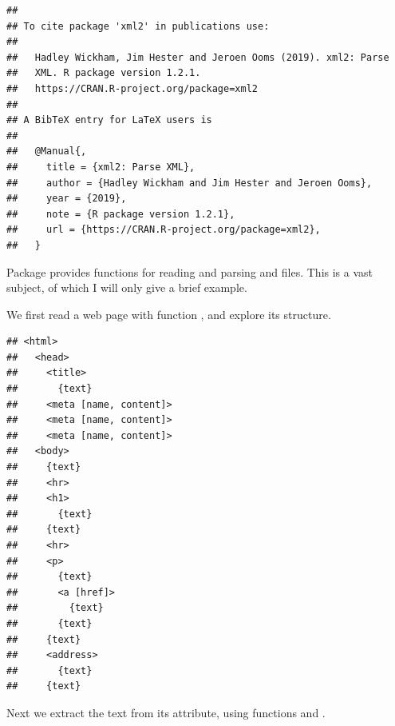 \documentclass[krantz2]{krantz}\usepackage{knitr}%
\begin{document}
\begin{knitrout}\footnotesize
{}\color{fgcolor}\begin{kframe}
\begin{alltt}
\hlstd{(} \hlstd{=} \hlstd{)}
\end{alltt}
\begin{verbatim}
## 
## To cite package 'xml2' in publications use:
## 
##   Hadley Wickham, Jim Hester and Jeroen Ooms (2019). xml2: Parse
##   XML. R package version 1.2.1.
##   https://CRAN.R-project.org/package=xml2
## 
## A BibTeX entry for LaTeX users is
## 
##   @Manual{,
##     title = {xml2: Parse XML},
##     author = {Hadley Wickham and Jim Hester and Jeroen Ooms},
##     year = {2019},
##     note = {R package version 1.2.1},
##     url = {https://CRAN.R-project.org/package=xml2},
##   }
\end{verbatim}
\end{kframe}
\end{knitrout}

Package  provides functions for reading and parsing  and  files. This is a vast subject, of which I will only give a brief example.

We first read a web page with function , and explore its structure.

\begin{knitrout}\footnotesize
{}\color{fgcolor}\begin{kframe}
\begin{alltt}
 \hlkwb{<-} \hlstd{(}\hlstd{)}
\end{alltt}
\begin{verbatim}
## <html>
##   <head>
##     <title>
##       {text}
##     <meta [name, content]>
##     <meta [name, content]>
##     <meta [name, content]>
##   <body>
##     {text}
##     <hr>
##     <h1>
##       {text}
##     {text}
##     <hr>
##     <p>
##       {text}
##       <a [href]>
##         {text}
##       {text}
##     {text}
##     <address>
##       {text}
##     {text}
\end{verbatim}
\end{kframe}
\end{knitrout}

Next we extract the text from its  attribute, using functions  and .
\end{document}
